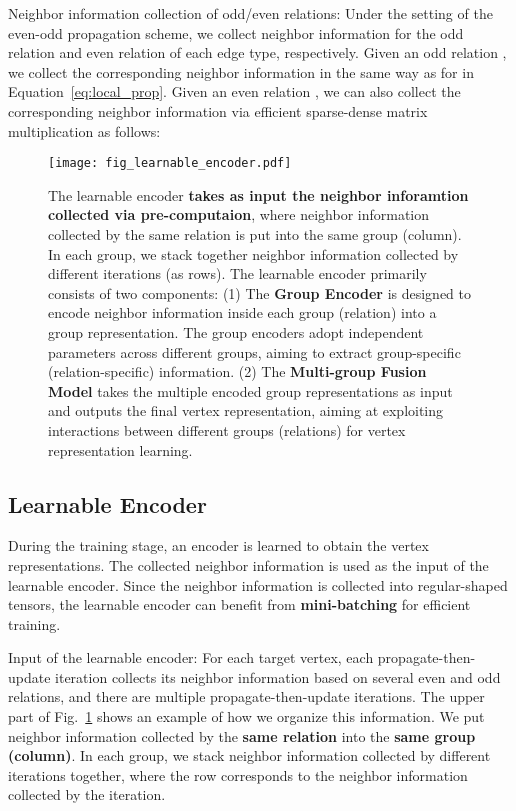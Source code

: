 \documentclass[lettersize,journal]{IEEEtran}
\begin{document}
Neighbor information collection of odd/even relations:
Under the setting of the even-odd propagation scheme, we collect neighbor information for the odd relation and even relation of each edge type, respectively.
Given an odd relation , we collect the corresponding neighbor information  in the same way as for  in Equation~\ref{eq:local_prop}.
Given an even relation , we can also collect the corresponding neighbor information via efficient sparse-dense matrix multiplication as follows:






\begin{figure}[!tp]
\centering\texttt{[image: fig\_learnable\_encoder.pdf]}
\vspace{-2mm}
\caption{
The learnable encoder \textbf{takes as input the neighbor inforamtion collected via pre-computaion}, where neighbor information collected by the same relation is put into the same group (column).
In each group, we stack together neighbor information collected by different iterations (as rows).
The learnable encoder primarily consists of two components: 
(1) The \textbf{Group Encoder} is designed to encode neighbor information inside each group (relation) into a group representation. 
The group encoders adopt independent parameters across different groups, aiming to extract group-specific (relation-specific) information. 
(2)  The \textbf{Multi-group Fusion Model} takes the multiple encoded group representations as input and outputs the final vertex representation, aiming at exploiting interactions between different groups (relations) for vertex representation learning.
}
 \label{fig:learnable_encoder}
 \vspace{-2mm}
\end{figure}


 
\subsection{Learnable Encoder}\label{sec:learnable_encoder}

During the training stage, an encoder is learned to obtain the vertex representations.
The collected neighbor information is used as the input of the learnable encoder.
Since the neighbor information is collected into regular-shaped tensors, the learnable encoder can benefit from \textbf{mini-batching} for efficient training.



Input of the learnable encoder:
For each target vertex, each propagate-then-update iteration collects its neighbor information based on several even and odd relations, and there are multiple propagate-then-update iterations.
The upper part of Fig.~\ref{fig:learnable_encoder} shows an example of how we organize this information.
We put neighbor information collected by the \textbf{same relation} into the \textbf{same group (column)}.
In each group, we stack neighbor information collected by different iterations together, where the  row corresponds to the neighbor information collected by the  iteration.
\end{document}
